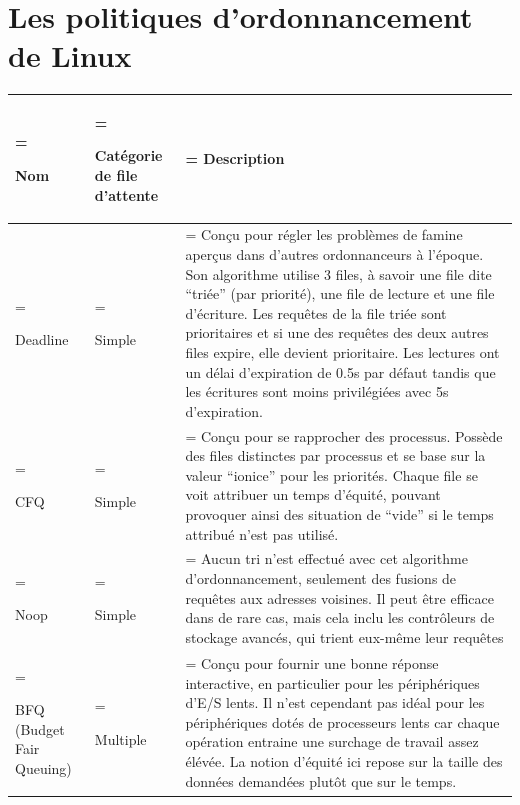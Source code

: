 \newpage
\section*{Les politiques d'ordonnancement de Linux}
\begin{table}[h!t]
    \begin{tabularx}{\textwidth} { 
        | >{\hsize=0.22\hsize\linewidth=\hsize\raggedright\arraybackslash}X 
        | >{\hsize=0.26\hsize\linewidth=\hsize\raggedright\arraybackslash}X 
        | >{\hsize=1.51\hsize\linewidth=\hsize\arraybackslash}X | }
        \hline
        \textbf{Nom} & \textbf{Catégorie de file d'attente} & \textbf
        {Description} \\
        \hline
        \hline
        Deadline & Simple & Conçu pour régler les problèmes de famine aperçus 
        dans d'autres ordonnanceurs à l'époque. Son algorithme utilise 3 files, 
        à savoir une file dite ``triée'' (par priorité), une file de lecture et 
        une file d'écriture. Les requêtes de la file triée sont prioritaires et 
        si une des requêtes des deux autres files expire, elle devient 
        prioritaire. Les lectures ont un délai d'expiration de 0.5s par défaut 
        tandis que les écritures sont moins privilégiées avec 5s d'expiration. 
        \\
        \hline
        CFQ & Simple & Conçu pour se rapprocher des processus. Possède des 
        files distinctes par processus et se base sur la valeur ``ionice'' pour 
        les priorités. Chaque file se voit attribuer un temps d'équité, pouvant 
        provoquer ainsi des situation de ``vide'' si le temps attribué n'est 
        pas utilisé. \\
        \hline
        Noop & Simple & Aucun tri n'est effectué avec cet algorithme 
        d'ordonnancement, seulement des fusions de requêtes aux adresses 
        voisines. Il peut être efficace dans de rare cas, mais cela inclu les 
        contrôleurs de stockage avancés, qui trient eux-même leur requêtes \\
        \hline
        BFQ (Budget Fair Queuing) & Multiple & Conçu pour fournir une bonne 
        réponse interactive, en particulier pour les périphériques d'E/S lents. 
        Il n'est cependant pas idéal pour les périphériques dotés de 
        processeurs lents car chaque opération entraine une surchage de travail 
        assez élévée. La notion d'équité ici repose sur la taille des données 
        demandées plutôt que sur le temps. \\

\end{tabularx}
\end{table}

